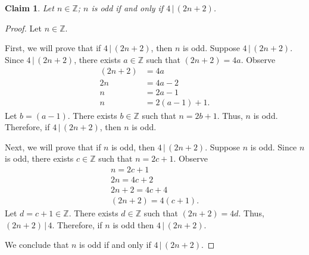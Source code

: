 \documentclass{article}
\newtheorem*{claim}{Claim}
\theoremstyle{definition}
\begin{document}
\begin{solution}
\begin{claim}
Let $n\in\mathbb{Z}$; $n$ is odd if and only if $4\,|\,(2n+2)$.
\end{claim}\begin{proof}
Let $n\in\mathbb{Z}$.

First, we will prove that if $4\,|\,(2n+2)$, then $n$ is odd. Suppose $4\,|\,(2n+2)$. Since $4\,|\,(2n+2)$, there exists $a\in\mathbb{Z}$ such that $(2n+2)=4a$. Observe
\begin{align}
(2n+2)&=4a\\
2n&=4a-2\\
n&=2a-1\\
n&=2(a-1)+1.
\end{align}
Let $b=(a-1)$. There exists $b\in\mathbb{Z}$ such that $n=2b+1$. Thus, $n$ is odd. Therefore, if $4\,|\,(2n+2)$, then $n$ is odd.

Next, we will prove that if $n$ is odd, then $4\,|\,(2n+2)$. Suppose $n$ is odd. Since $n$ is odd, there exists $c\in\mathbb{Z}$ such that $n=2c+1$. Observe
\begin{align}
n=2c+1\\
2n=4c+2\\
2n+2=4c+4\\
(2n+2)=4(c+1).
\end{align}
Let $d=c+1\in\mathbb{Z}$. There exists $d\in\mathbb{Z}$ such that $(2n+2)=4d$. Thus, $(2n+2)\,|\,4$. Therefore, if $n$ is odd then $4\,|\,(2n+2)$.

We conclude that $n$ is odd if and only if $4\,|\,(2n+2)$.
\end{proof}
\end{solution}
\end{document}
